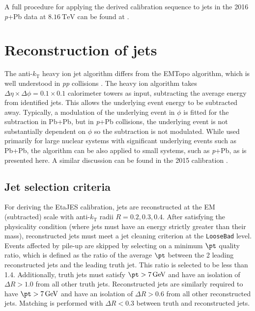 \documentclass[NOTE, atlasdraft=true, texlive=2016, USenglish]{\ATLASLATEXPATH atlasdoc}
\begin{document}
A full procedure for applying the derived calibration sequence to jets in the 2016 \textit{p}+Pb data at $\SI{8.16}{\TeV}$ can be found at \cite{HIRun2JESdata2016}.

\section{Reconstruction of jets}
\label{sec:reconstruction}

The anti-$k_{\text{T}}$ heavy ion jet algorithm differs from the EMTopo algorithm, which is well understood in \textit{pp} collisions \cite{Cacciari:2008gp}. The heavy ion algorithm takes $\Delta\eta\times\Delta\phi=0.1\times0.1$ calorimeter towers as input, subtracting the average energy from identified jets. This allows the underlying event energy to be subtracted away. Typically, a modulation of the underlying event in $\phi$ is fitted for the subtraction in Pb+Pb, but in \textit{p}+Pb collisions, the underlying event is not substantially dependent on $\phi$ so the subtraction is not modulated. While used primarily for large nuclear systems with significant underlying events such as Pb+Pb, the algorithm can be also applied to small systems, such as \textit{p}+Pb, as is presented here. A similar discussion can be found in the 2015 calibration \cite{ATL-COM-PHYS-2016-101}.\par
\subsection{Jet selection criteria}
For deriving the EtaJES calibration, jets are reconstructed at the EM (subtracted) scale with anti-$k_{\text{T}}$ radii $R=0.2, 0.3, 0.4$. After satisfying the physicality condition (where jets must have an energy strictly greater than their mass), reconstructed jets must meet a jet cleaning criterion at the \texttt{LooseBad} level. Events affected by pile-up are skipped by selecting on a minimum $\pt$ quality ratio, which is defined as the ratio of the average $\pt$ between the 2 leading reconstructed jets and the leading truth jet. This ratio is selected to be less than 1.4. Additionally, truth jets must satisfy $\pt > \SI{7}{\GeV}$ and have an isolation of $\Delta R > 1.0$ from all other truth jets. Reconstructed jets are similarly required to have $\pt > \SI{7}{\GeV}$ and have an isolation of $\Delta R > 0.6$ from all other reconstructed jets. Matching is performed with $\Delta R < 0.3$ between truth and reconstructed jets.
\end{document}
